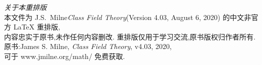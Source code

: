 \thispagestyle{empty}
\begin{center}
    \small
    \noindent\emph{关于本重排版}\\[0.5em]
    本文件为 J.S.\ Milne\emph{Class Field Theory}(Version 4.03, August 6, 2020)
    的中文非官方 \LaTeX{} 重排版,\\
    内容忠实于原书,未作任何内容删改.
    重排版仅用于学习交流,原书版权归作者所有.\\
    \vspace{0.5cm}
    原书:James S. Milne, \textit{Class Field Theory}, v4.03, 2020,\\
    可于 www.jmilne.org/math/ 免费获取.
\end{center}
